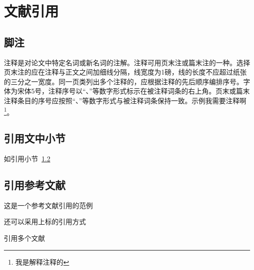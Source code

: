 
\chapter{文献引用}

\section{脚注}
注释是对论文中特定名词或新名词的注解。注释可用页末注或篇末注的一种。选择页末注的应在注释与正文之间加细线分隔，线宽度为1磅，线的长度不应超过纸张的三分之一宽度。同一页类列出多个注释的，应根据注释的先后顺序编排序号。字体为宋体5号，注释序号以“、”等数字形式标示在被注释词条的右上角。页末或篇末注释条目的序号应按照“、”等数字形式与被注释词条保持一致。示例我需要注释啊\footnote{我是解释注释的}。

\section{引用文中小节}\label{sec:ref}
如引用小节~\ref{sec:ref}

\section{引用参考文献}
这是一个参考文献引用的范例\cite{kuhn2004man}

还可以采用上标的引用方式

引用多个文献\cite{kuhn2004man,江泽民2008新时期我国信息技术产业的发展,江泽民1989能源发展趋势及主要节能措施}